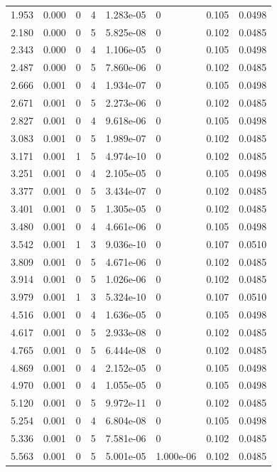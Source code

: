\documentclass[preview]{standalone}
\begin{document}
{{\begin{tabular}{L{1.2cm}C{1.2cm} C{0.3cm}C{0.5cm} C{1.4cm}C{1.4cm} C{1.4cm}C{1.4cm}}
  1.953  &  0.000  & 0     &  4 &  1.283e-05  & 0  & 0.105 &  0.0498   \\ 
  2.180  &  0.000  & 0     &  5 &  5.825e-08  & 0  & 0.102 &  0.0485   \\ 
  2.343  &  0.000  & 0     &  4 &  1.106e-05  & 0  & 0.105 &  0.0498   \\ 
  2.487  &  0.000  & 0     &  5 &  7.860e-06  & 0  & 0.102 &  0.0485   \\ 
  2.666  &  0.001  & 0     &  4 &  1.934e-07  & 0  & 0.105 &  0.0498   \\ 
  2.671  &  0.001  & 0     &  5 &  2.273e-06  & 0  & 0.102 &  0.0485   \\ 
  2.827  &  0.001  & 0     &  4 &  9.618e-06  & 0  & 0.105 &  0.0498   \\ 
  3.083  &  0.001  & 0     &  5 &  1.989e-07  & 0  & 0.102 &  0.0485   \\ 
  3.171  &  0.001  & 1     &  5 &  4.974e-10  & 0  & 0.102 &  0.0485   \\ 
  3.251  &  0.001  & 0     &  4 &  2.105e-05  & 0  & 0.105 &  0.0498   \\ 
  3.377  &  0.001  & 0     &  5 &  3.434e-07  & 0  & 0.102 &  0.0485   \\ 
  3.401  &  0.001  & 0     &  5 &  1.305e-05  & 0  & 0.102 &  0.0485   \\ 
  3.480  &  0.001  & 0     &  4 &  4.661e-06  & 0  & 0.105 &  0.0498   \\ 
  3.542  &  0.001  & 1     &  3 &  9.036e-10  & 0  & 0.107 &  0.0510   \\ 
  3.809  &  0.001  & 0     &  5 &  4.671e-06  & 0  & 0.102 &  0.0485   \\ 
  3.914  &  0.001  & 0     &  5 &  1.026e-06  & 0  & 0.102 &  0.0485   \\ 
  3.979  &  0.001  & 1     &  3 &  5.324e-10  & 0  & 0.107 &  0.0510   \\ 
  4.516  &  0.001  & 0     &  4 &  1.636e-05  & 0  & 0.105 &  0.0498   \\ 
  4.617  &  0.001  & 0     &  5 &  2.933e-08  & 0  & 0.102 &  0.0485   \\ 
  4.765  &  0.001  & 0     &  5 &  6.444e-08  & 0  & 0.102 &  0.0485   \\ 
  4.869  &  0.001  & 0     &  4 &  2.152e-05  & 0  & 0.105 &  0.0498   \\ 
  4.970  &  0.001  & 0     &  4 &  1.055e-05  & 0  & 0.105 &  0.0498   \\ 
  5.120  &  0.001  & 0     &  5 &  9.972e-11  & 0  & 0.102 &  0.0485   \\ 
  5.254  &  0.001  & 0     &  4 &  6.804e-08  & 0  & 0.105 &  0.0498   \\ 
  5.336  &  0.001  & 0     &  5 &  7.581e-06  & 0  & 0.102 &  0.0485   \\ 
  5.563  &  0.001  & 0     &  5 &  5.001e-05  & 1.000e-06  & 0.102 &  0.0485   \\ 
\hline 
\end{tabular} 

}}
\end{document}
